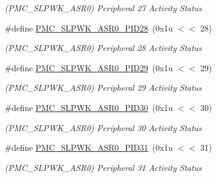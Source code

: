 \begin{DoxyCompactItemize}
\begin{DoxyCompactList}\small\item\em (P\+M\+C\+\_\+\+S\+L\+P\+W\+K\+\_\+\+A\+S\+R0) Peripheral 27 Activity Status \end{DoxyCompactList}\item 
\mbox{\label{group__SAME70__PMC_ga9fe54756fc91d85c706b725f405b47ec}} 
\#define \mbox{\hyperlink{group__SAME70__PMC_ga9fe54756fc91d85c706b725f405b47ec}{P\+M\+C\+\_\+\+S\+L\+P\+W\+K\+\_\+\+A\+S\+R0\+\_\+\+P\+I\+D28}}~(0x1u $<$$<$ 28)
\begin{DoxyCompactList}\small\item\em (P\+M\+C\+\_\+\+S\+L\+P\+W\+K\+\_\+\+A\+S\+R0) Peripheral 28 Activity Status \end{DoxyCompactList}\item 
\mbox{\label{group__SAME70__PMC_gaade9c863351e946fbb65ca740530d96b}} 
\#define \mbox{\hyperlink{group__SAME70__PMC_gaade9c863351e946fbb65ca740530d96b}{P\+M\+C\+\_\+\+S\+L\+P\+W\+K\+\_\+\+A\+S\+R0\+\_\+\+P\+I\+D29}}~(0x1u $<$$<$ 29)
\begin{DoxyCompactList}\small\item\em (P\+M\+C\+\_\+\+S\+L\+P\+W\+K\+\_\+\+A\+S\+R0) Peripheral 29 Activity Status \end{DoxyCompactList}\item 
\mbox{\label{group__SAME70__PMC_gafdc5a98b12be110e23239c61caa66d52}} 
\#define \mbox{\hyperlink{group__SAME70__PMC_gafdc5a98b12be110e23239c61caa66d52}{P\+M\+C\+\_\+\+S\+L\+P\+W\+K\+\_\+\+A\+S\+R0\+\_\+\+P\+I\+D30}}~(0x1u $<$$<$ 30)
\begin{DoxyCompactList}\small\item\em (P\+M\+C\+\_\+\+S\+L\+P\+W\+K\+\_\+\+A\+S\+R0) Peripheral 30 Activity Status \end{DoxyCompactList}\item 
\mbox{\label{group__SAME70__PMC_gab23c1221c3773c42011247533325c5f7}} 
\#define \mbox{\hyperlink{group__SAME70__PMC_gab23c1221c3773c42011247533325c5f7}{P\+M\+C\+\_\+\+S\+L\+P\+W\+K\+\_\+\+A\+S\+R0\+\_\+\+P\+I\+D31}}~(0x1u $<$$<$ 31)
\begin{DoxyCompactList}\small\item\em (P\+M\+C\+\_\+\+S\+L\+P\+W\+K\+\_\+\+A\+S\+R0) Peripheral 31 Activity Status \end{DoxyCompactList}\item 

\end{DoxyCompactItemize}
